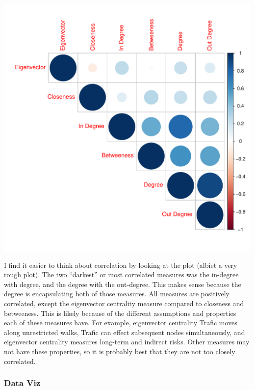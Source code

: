 \documentclass[12pt]{article}\usepackage[]{graphicx}\usepackage[]{color}
\makeatletter
\newenvironment{kframe}{%
 \def\at@end@of@kframe{}%
 \ifinner\ifhmode%
  \def\at@end@of@kframe{\end{minipage}}%
  \begin{minipage}{\columnwidth}%
 \fi\fi%
 \def\FrameCommand##1{\hskip\@totalleftmargin \hskip-\fboxsep
 \colorbox{shadecolor}{##1}\hskip-\fboxsep
     \hskip-\linewidth \hskip-\@totalleftmargin \hskip\columnwidth}%
 \MakeFramed {\advance\hsize-\width
   \@totalleftmargin\z@ \linewidth\hsize
   \@setminipage}}%
 {\par\unskip\endMakeFramed%
 \at@end@of@kframe}
\newenvironment{knitrout}{}{} %
\makeatother
\begin{document}
\begin{flushleft}
\begin{center}
\begin{knitrout}
\begin{kframe}
\begin{alltt}
\end{alltt}
\end{kframe}
\includegraphics[width=6in]{figure/comp-1} 

\end{knitrout}
\end{center}


I find it easier to think about correlation by looking at the plot (albiet a very rough plot). The two ``darkest'' or most correlated measures was the in-degree with degree, and the degree with the out-degree. This makes sense because the degree is encapsulating both of those measures. All measures are positively correlated, except the eigenvector centrality measure compared to closeness and betweeness. This is likely because of the different assumptions and properties each of these measures have. For example, eigenvector centrality Trafic moves along unrestricted walks, Trafic can effect subsequent nodes simultaneously, and eigenvector centrality measures long-term and indirect risks. Other measures may not have these properties, so it is probably best that they are not too closely correlated.



\subsubsection{Data Viz}


\end{flushleft}
\end{document}
